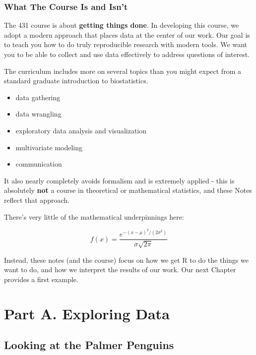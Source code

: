\documentclass[
]{book}
\providecommand{\tightlist}{%
  \setlength{\itemsep}{0pt}\setlength{\parskip}{0pt}}
\begin{document}
\hypertarget{what-the-course-is-and-isnt}{%
\section{What The Course Is and Isn't}\label{what-the-course-is-and-isnt}}

The 431 course is about \textbf{getting things done}. In developing this course, we adopt a modern approach that places data at the center of our work. Our goal is to teach you how to do truly reproducible research with modern tools. We want you to be able to collect and use data effectively to address questions of interest.

The curriculum includes more on several topics than you might expect from a standard graduate introduction to biostatistics.

\begin{itemize}
\tightlist
\item
  data gathering
\item
  data wrangling
\item
  exploratory data analysis and visualization
\item
  multivariate modeling
\item
  communication
\end{itemize}

It also nearly completely avoids formalism and is extremely applied - this is absolutely \textbf{not} a course in theoretical or mathematical statistics, and these Notes reflect that approach.

There's very little of the mathematical underpinnings here:

\[
f(x) = \frac{e^{-(x - \mu)^{2}/(2\sigma^{2})}}{\sigma{\sqrt{2 \pi }}} 
\]

Instead, these notes (and the course) focus on how we get R to do the things we want to do, and how we interpret the results of our work. Our next Chapter provides a first example.

\hypertarget{part-part-a.-exploring-data}{%
\part*{Part A. Exploring Data}\label{part-part-a.-exploring-data}}

\hypertarget{looking-at-the-palmer-penguins}{%
\chapter{Looking at the Palmer Penguins}\label{looking-at-the-palmer-penguins}}
\end{document}
